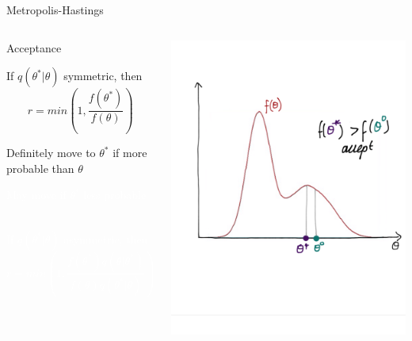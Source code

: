 \documentclass[compress]{beamer}
\begin{document}
\begin{frame}[label=sec-7-6]{Metropolis-Hastings}
\begin{columns}[c] 
\begin{block}{Acceptance}
\begin{itemize}
\item If $q(\theta^*|\theta)$ symmetric, then 
$$ r = min \left( 1,\dfrac{f(\theta^*)}{f(\theta)} \right)$$ 
\item Definitely move to $\theta^*$ if more probable than $\theta$ 
\textcolor{white}{
\item[\color{white}] May move if $\theta^*$ less probable \\~\\
\item[\color{white}] If $q(\theta^*|\theta)$ asymmetric, then $$ r = min \left( 1,\dfrac{f(\theta^*)q(\theta|\theta^*)}{f(\theta)q(\theta^*|\theta)} \right)$$
}
\end{itemize}
\end{block}

\includegraphics[width=1\linewidth]{MH3}
\end{columns}
\end{frame}
\end{document}
